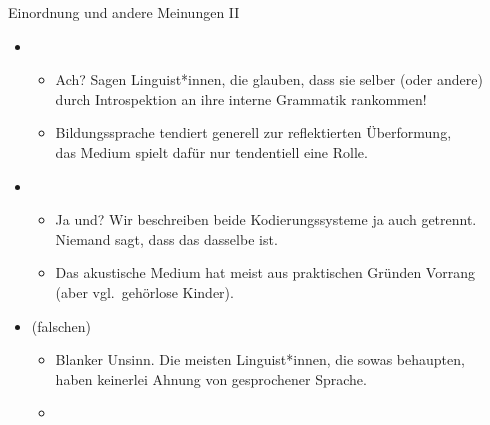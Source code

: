 \begin{frame}
  {Einordnung und andere Meinungen II}
  \pause
  \begin{itemize}[<+->]
    \item {}
      \begin{itemize}[<+->]
        \item \alert{Ach? Sagen Linguist*innen, die glauben, dass sie selber (oder andere)\\
          durch Introspektion an ihre interne Grammatik rankommen!}
        \item Bildungssprache tendiert generell zur reflektierten \alert{Überformung},\\
          das Medium spielt dafür nur tendentiell eine Rolle.
      \end{itemize}
      \Viertelzeile
    \item {}
      \begin{itemize}[<+->]
        \item \alert{Ja und? Wir beschreiben beide Kodierungssysteme ja auch getrennt.\\
          Niemand sagt, dass das dasselbe ist.}
        \item Das akustische Medium hat meist aus praktischen Gründen Vorrang\\
          (aber vgl.\ \zB gehörlose Kinder).
      \end{itemize}
      \Viertelzeile
    \item {} (falschen) 
      \begin{itemize}[<+->]
        \item \alert{Blanker Unsinn. Die meisten Linguist*innen, die sowas behaupten,\\
          haben keinerlei Ahnung von gesprochener Sprache.}
        \item {}
      \end{itemize}
  \end{itemize}
\end{frame}

